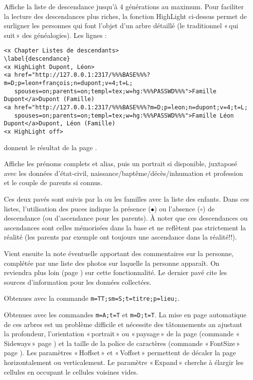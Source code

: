 \begin{description}[style=nextline]
\item[Liste de descendance] Affiche la liste de descendance jusqu'à 4
générations au maximum. Pour faciliter la lecture des descendances plus riches,
la fonction HighLight ci-dessus permet de surligner les personnes
qui font l'objet d'un arbre détaillé (le traditionnel «\,qui suit\,» des généalogies).
Les lignes :
\begin{verbatim}
<x Chapter Listes de descendants>
\label{descendance}
<x HighLight Dupont, Léon>
<a href="http://127.0.0.1:2317/%%%BASE%%%?m=D;p=leon+françois;n=dupont;v=4;t=L;
   spouses=on;parents=on;templ=tex;w=hg:%%%PASSWD%%%">Famille Dupont</a>Dupont (Famille)
<a href="http://127.0.0.1:2317/%%%BASE%%%?m=D;p=leon;n=dupont;v=4;t=L;
   spouses=on;parents=on;templ=tex;w=hg:%%%PASSWD%%%">Famille Léon Dupont</a>Dupont, Léon (Famille)
<x HighLight off>
\end{verbatim}
donnent le résultat de la page \pageref{descendance}.

\item[Page perso] Affiche les prénoms complets et alias, puis
un portrait si disponible, juxtaposé avec les
données d'état-civil, naissance/baptême/décès/inhumation et profession
et le couple de parents si connus.

Ces deux pavés sont suivis par la ou les familles avec la liste des enfants.
Dans ces listes, l'utilisation des puces indique la présence ($\bullet$)
ou l'absence ($\circ$) de descendance (ou d'ascendance pour les parents).
À noter que ces descendances ou ascendances sont celles mémorisées dans la base
et ne reflètent pas strictement la réalité (les parents par exemple ont toujours
une ascendance dans la réalité!!).

Vient ensuite la note éventuelle apportant des commentaires sur la personne,
complétée par une liste des photos sur laquelle la personne apparaît.
On reviendra plus loin (page \pageref{images}) sur cette fonctionnalité.
Le dernier pavé cite les sources d'information pour les données collectées.

\item[Liste par titre] Obtenues avec la commande
\verb|m=TT;sm=S;t=titre;p=lieu;|.

\item[Arbres] Obtenues avec les commandes \verb|m=A;t=T| et \verb|m=D;t=T|.
La mise en page automatique de ces arbres est un problème difficile et
nécessite des tâtonnements an ajustant la profondeur, l'orientation «\,portrait\,»
ou «\,paysage\,» de la page (commande «\,Sideways\,» page \pageref{sideways}) et la
taille de la police de caractères (commande «\,FontSize\,» page \pageref{fontsize}).
Les paramètres «\,Hoffset\,» et «\,Voffset\,» permettent de décaler la page
horizontalement ou verticalement. Le paramètre «\,Expand\,» cherche à élargir
les cellules en occupant le cellules voisines vides.


\end{description}
